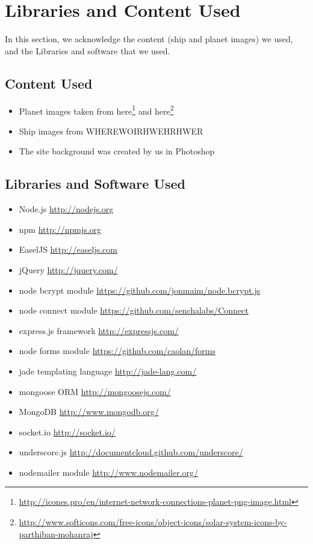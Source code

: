 \documentclass[a4paper,11pt]{article}
\begin{document}
	
	\section{Libraries and Content Used}
		In this section, we acknowledge the content (ship and planet images) we used, and the Libraries and software that we used.
		
		\subsection{Content Used}
			\begin{itemize}
				\item Planet images taken from here\footnote{\url{http://icones.pro/en/internet-network-connections-planet-png-image.html}} and here\footnote{\url{http://www.softicons.com/free-icons/object-icons/solar-system-icons-by-parthiban-mohanraj}}
				\item Ship images from WHEREWOIRHWEHRHWER
				\item The site background was created by us in Photoshop
			\end{itemize}
			
		\subsection{Libraries and Software Used}
			\begin{itemize}
				\item Node.js \url{http://nodejs.org}
				\item npm \url{http://npmjs.org}
				\item EaselJS \url{http://easeljs.com}
				\item jQuery \url{http://jquery.com/}
				\item node bcrypt module \url{https://github.com/jonmaim/node.bcrypt.js}
				\item node connect module \url{https://github.com/senchalabs/Connect}
				\item express.js framework \url{http://expressjs.com/}
				\item node forms module \url{https://github.com/caolan/forms}
				\item jade templating language \url{http://jade-lang.com/}
				\item mongoose ORM \url{http://mongoosejs.com/}
				\item MongoDB \url{http://www.mongodb.org/}
				\item socket.io \url{http://socket.io/}
				\item underscore.js \url{http://documentcloud.github.com/underscore/}
				\item nodemailer module \url{http://www.nodemailer.org/}
			\end{itemize}
	
\end{document}
